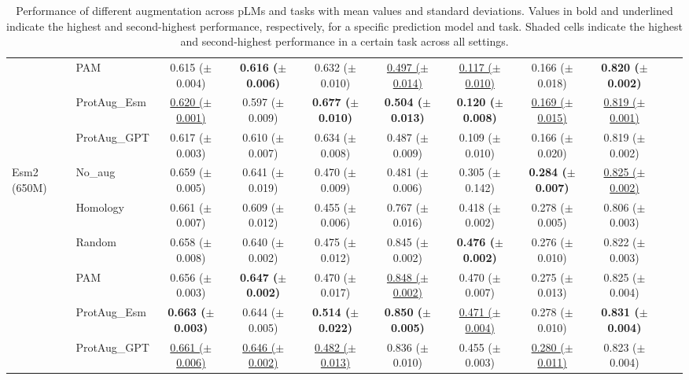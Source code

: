 \documentclass{article}
\begin{document}
\begin{table}[t]
\begin{tabular}{llccccccccc}
    & PAM & 0.615 ($\pm$0.004) & \textbf{0.616 ($\pm$0.006)} & 0.632 ($\pm$0.010) & \underline{0.497 ($\pm$0.014)} & \underline{0.117 ($\pm$0.010)} & 0.166 ($\pm$0.018) & \textbf{0.820 ($\pm$0.002)} \\
    & ProtAug\_Esm & \underline{0.620 ($\pm$0.001)} & 0.597 ($\pm$0.009) & \cellcolor[gray]{0.8}\textbf{0.677 ($\pm$0.010)} & \textbf{0.504 ($\pm$0.013)} & \textbf{0.120 ($\pm$0.008)} & \underline{0.169 ($\pm$0.015)} & \underline{0.819 ($\pm$0.001)} \\
    & ProtAug\_GPT & 0.617 ($\pm$0.003) & 0.610 ($\pm$0.007) & 0.634 ($\pm$0.008) & 0.487 ($\pm$0.009) & 0.109 ($\pm$0.010) & 0.166 ($\pm$0.020) & 0.819 ($\pm$0.002) \\
    \hline
    \multirow{6}{*}{Esm2 (650M)} 
    & No\_aug & 0.659 ($\pm$0.005) & 0.641 ($\pm$0.019) & 0.470 ($\pm$0.009) & 0.481 ($\pm$0.006) & 0.305 ($\pm$0.142) & \cellcolor[gray]{0.8}\textbf{0.284 ($\pm$0.007)} & \cellcolor[gray]{0.8}\underline{0.825 ($\pm$0.002)} \\
    & Homology & 0.661 ($\pm$0.007) & 0.609 ($\pm$0.012) & 0.455 ($\pm$0.006) & 0.767 ($\pm$0.016) & 0.418 ($\pm$0.002) & 0.278 ($\pm$0.005) & 0.806 ($\pm$0.003) \\
    & Random & 0.658 ($\pm$0.008) & 0.640 ($\pm$0.002) & 0.475 ($\pm$0.012) & 0.845 ($\pm$0.002) & \cellcolor[gray]{0.8}\textbf{0.476 ($\pm$0.002)} & 0.276 ($\pm$0.010) & 0.822 ($\pm$0.003) \\
    & PAM & 0.656 ($\pm$0.003) & \cellcolor[gray]{0.8}\textbf{0.647 ($\pm$0.002)} & 0.470 ($\pm$0.017) & \cellcolor[gray]{0.8}\underline{0.848 ($\pm$0.002)} & 0.470 ($\pm$0.007) & 0.275 ($\pm$0.013) & 0.825 ($\pm$0.004) \\
    & ProtAug\_Esm & \cellcolor[gray]{0.8}\textbf{0.663 ($\pm$0.003)} & 0.644 ($\pm$0.005) & \textbf{0.514 ($\pm$0.022)} & \cellcolor[gray]{0.8}\textbf{0.850 ($\pm$0.005)} & \cellcolor[gray]{0.8}\underline{0.471 ($\pm$0.004)} & 0.278 ($\pm$0.010) & \cellcolor[gray]{0.8}\textbf{0.831 ($\pm$0.004)} \\
    & ProtAug\_GPT & \cellcolor[gray]{0.8}\underline{0.661 ($\pm$0.006)} & \cellcolor[gray]{0.8}\underline{0.646 ($\pm$0.002)} & \underline{0.482 ($\pm$0.013)} & 0.836 ($\pm$0.010) & 0.455 ($\pm$0.003) & \cellcolor[gray]{0.8}\underline{0.280 ($\pm$0.011)} & 0.823 ($\pm$0.004) \\
    \hline
    \end{tabular}
    \caption{Performance of different augmentation across pLMs and tasks with mean values and standard deviations. Values in bold and underlined indicate the highest and second-highest performance, respectively, for a specific prediction model and task. Shaded cells indicate the highest and second-highest performance in a certain task across all settings.}
    \label{tab:results}
\end{table}
\end{document}
